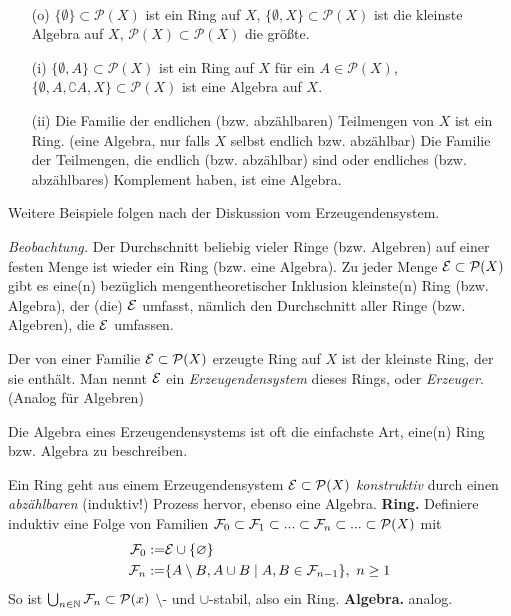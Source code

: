\begin{example} \
\begin{enumerate}
\item[(o)] $\{ \emptyset\} \subset \mathcal{P}(X)$ ist ein Ring auf $X$, \newline
$\{\emptyset, X\} \subset \mathcal{P}(X)$ ist die kleinste Algebra auf $X$, $\mathcal{P}(X) \subset \mathcal{P}(X)$ die größte.
\item [(i)] $\{ \emptyset, A \} \subset \mathcal{P}(X)$ ist ein Ring auf $X$ für ein $A \in \mathcal{P}(X)$, \newline
$\{\emptyset, A, \complement A, X\} \subset \mathcal{P}(X) $ ist eine Algebra auf $X$.
\item[(ii)] Die Familie der endlichen (bzw. abzählbaren) Teilmengen von $X$ ist ein Ring. (eine Algebra, nur falls $X$ selbst endlich bzw. abzählbar) \newline
Die Familie der Teilmengen, die endlich (bzw. abzählbar) sind oder endliches (bzw. abzählbares) Komplement haben, ist eine Algebra.
\end{enumerate}
Weitere Beispiele folgen nach der Diskussion vom Erzeugendensystem.
\end{example}
\textit{Beobachtung.} Der Durchschnitt beliebig vieler Ringe (bzw. Algebren) auf einer festen Menge ist wieder ein Ring (bzw. eine Algebra). Zu jeder Menge $\mathcal{E} \subset \mathcal{P}(X)$ gibt es eine(n) bezüglich mengentheoretischer Inklusion kleinste(n) Ring (bzw. Algebra), der (die) $\mathcal{E}$ umfasst, nämlich den Durchschnitt aller Ringe (bzw. Algebren), die $\mathcal{E}$ umfassen.
\begin{definition}
\begin{mdframed}
Der von einer Familie $\mathcal{E} \subset \mathcal{P}(X)$ erzeugte Ring auf $X$ ist der kleinste Ring, der sie enthält. Man nennt $\mathcal{E}$ ein \emph{Erzeugendensystem} dieses Rings, oder \emph{Erzeuger}. (Analog für Algebren)
\end{mdframed}
Die Algebra eines Erzeugendensystems ist oft die einfachste Art, eine(n) Ring bzw. Algebra zu beschreiben. 
\end{definition}
Ein Ring geht aus einem Erzeugendensystem $\mathcal{E} \subset \mathcal{P}(X)$ \emph{konstruktiv} durch einen \emph{abzählbaren} (induktiv!) Prozess hervor, ebenso eine Algebra. \vspace{0.5pc}
\newline
\textbf{Ring.} Definiere induktiv eine Folge von Familien $\mathcal{F}_0 \subset \mathcal{F}_1 \subset ... \subset \mathcal{F}_n \subset ... \subset \mathcal{P}(X)$ mit
\begin{align*}
\mathcal{F}_0 : = &\mathcal{E}\cup \{\varnothing\}  \\
\mathcal{F}_n :=  &\{ A\setminus B, A \cup B \mid A,B \in \mathcal{F}_{n-1} \},\  n \geq 1
\end{align*}
So ist $\bigcup_{n\in \mathbb{N}} \mathcal{F}_n \subset \mathcal{P}(x)$ $\setminus$- und $\cup$-stabil, also ein Ring.  \vspace{0.5pc} \newline 
\textbf{Algebra.} analog.
